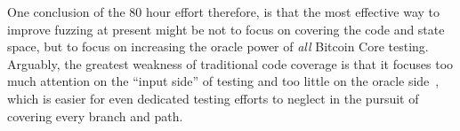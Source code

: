 One conclusion of the 80 hour effort therefore, is that the most
effective way to improve fuzzing at present might be not to focus on
covering the code and state space, but to focus on increasing the
oracle power of \emph{all} Bitcoin Core testing.  Arguably, the
greatest weakness of traditional code coverage is that it focuses too
much attention on the ``input side'' of testing and too little on the
oracle side~\cite{barr2014oracle}, which is easier for even dedicated
testing efforts to neglect in the pursuit of covering every branch and
path.  